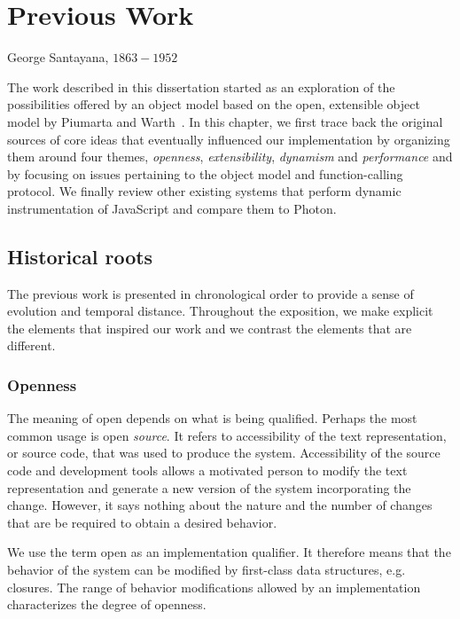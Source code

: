 \chapter{Previous Work}
\label{chap:PreviousWork} 

{George Santayana, $1863-1952$}

The work described in this dissertation started as an exploration of the
possibilities offered by an object model based on the open, extensible object
model by Piumarta and Warth~\cite{Piumarta:2008}. In this chapter, we first
trace back the original sources of core ideas that eventually influenced our
implementation by organizing them around four themes, \textit{openness},
\textit{extensibility}, \textit{dynamism} and \textit{performance} and by
focusing on issues pertaining to the object model and function-calling
protocol. We finally review other existing systems that perform dynamic
instrumentation of JavaScript and compare them to Photon.

\section{Historical roots}

The previous work is presented in chronological order to provide a sense of
evolution and temporal distance. Throughout the exposition, we make explicit
the elements that inspired our work and we contrast the elements that are
different.

\subsection{Openness}

The meaning of open depends on what is being qualified. Perhaps the most common
usage is open \textit{source}. It refers to accessibility of the text
representation, or source code, that was used to produce the system.
Accessibility of the source code and development tools allows a motivated
person to modify the text representation and generate a new version of the
system incorporating the change. However, it says nothing about the nature and
the number of changes that are be required to obtain a desired behavior.

We use the term open as an implementation qualifier. It therefore means that
the behavior of the system can be modified by first-class data structures, e.g.
closures. The range of behavior modifications allowed by an implementation
characterizes the degree of openness.

